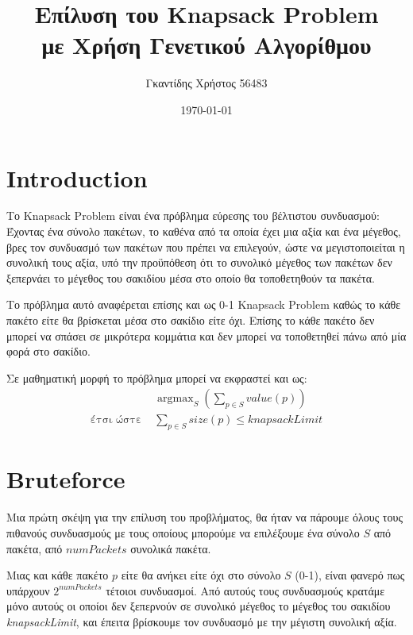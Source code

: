 \documentclass{article}
\title{Επίλυση του Knapsack Problem\\με Χρήση Γενετικού Αλγορίθμου}
\date{\today}
\author{Γκαντίδης Χρήστος 56483}
\DeclareMathOperator*{\argmax}{argmax}
\begin{document}
\maketitle
\newpage

\tableofcontents
\newpage


\section{Introduction}

Το Knapsack Problem είναι ένα πρόβλημα εύρεσης του βέλτιστου συνδυασμού: Έχοντας
ένα σύνολο πακέτων, το καθένα από τα οποία έχει μια αξία και ένα μέγεθος, βρες
τον συνδυασμό των πακέτων που πρέπει να επιλεγούν, ώστε να μεγιστοποιείται η
συνολική τους αξία, υπό την προϋπόθεση ότι το συνολικό μέγεθος των πακέτων δεν
ξεπερνάει το μέγεθος του σακιδίου μέσα στο οποίο θα τοποθετηθούν τα πακέτα.

Το πρόβλημα αυτό αναφέρεται επίσης και ως 0-1 Knapsack Problem καθώς το κάθε
πακέτο είτε θα βρίσκεται μέσα στο σακίδιο είτε όχι. Επίσης το κάθε πακέτο δεν
μπορεί να σπάσει σε μικρότερα κομμάτια και δεν μπορεί να τοποθετηθεί πάνω από
μία φορά στο σακίδιο.

Σε μαθηματική μορφή το πρόβλημα μπορεί να εκφραστεί και ως:
\begin{align*}
    &\argmax_{S}\left(\sum_{p \in S}\textit{value}(p)\right)\\
    \text{έτσι ώστε } &\sum_{p \in S}\textit{size}(p) \leq \textit{knapsackLimit}
\end{align*}

\section{Bruteforce}

Μια πρώτη σκέψη για την επίλυση του προβλήματος, θα ήταν να πάρουμε όλους τους
πιθανούς συνδυασμούς με τους οποίους μπορούμε να επιλέξουμε ένα σύνολο $S$ από
πακέτα, από $\textit{numPackets}$ συνολικά πακέτα.

Μιας και κάθε πακέτο $p$ είτε θα ανήκει είτε όχι στο σύνολο $S$ (0-1), είναι
φανερό πως υπάρχουν $2^{\textit{numPackets}}$ τέτοιοι συνδυασμοί. Από αυτούς
τους συνδυασμούς κρατάμε μόνο αυτούς οι οποίοι δεν ξεπερνούν σε συνολικό μέγεθος
το μέγεθος του σακιδίου \textit{knapsackLimit}, και έπειτα βρίσκουμε τον
συνδυασμό με την μέγιστη συνολική αξία.
\end{document}
